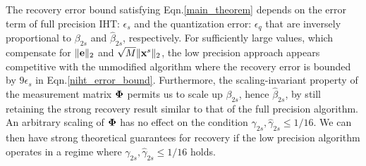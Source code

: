 \documentclass{article}
\begin{document}
 The recovery error bound satisfying Eqn.\ref{main_theorem} depends on the error term of full precision IHT: $ {\epsilon_s}$ and the quantization error: $ {\epsilon}_q$ that are inversely proportional to ${\beta}_{2s}$ and $\hat{\beta}_{2s}$, respectively. For sufficiently large values, which compensate for $\|{\bf e}\|_2$ and $\sqrt{M} \|{\bf x}^s \|_2$, the low precision approach appears competitive with the unmodified algorithm where the recovery error is bounded by $9\epsilon_s$ in Eqn.\ref{niht_error_bound}. Furthermore, the scaling-invariant property of the measurement matrix ${\bf \Phi}$ permits us to scale up ${\beta}_{2s}$, hence $\hat{\beta}_{2s}$, by still retaining the strong recovery result similar to that of the full precision algorithm. An arbitrary scaling of ${\bf \Phi}$ has no effect on the condition ${\gamma}_{2s}, \hat{\gamma}_{2s}\leq 1/16$. We can then have strong theoretical guarantees for recovery if the low precision algorithm operates in a regime where ${\gamma}_{2s}, \hat{\gamma}_{2s}\leq 1/16$ holds.

\end{document}
